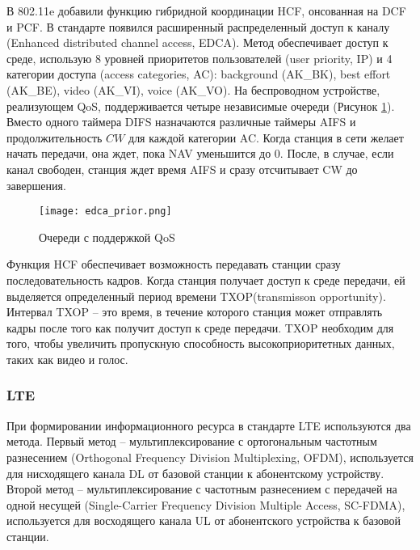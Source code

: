 В 802.11e добавили функцию гибридной координации HCF, онсованная на DCF и PCF. В стандарте появился расширенный распределенный доступ к каналу (Enhanced distributed channel access, EDCA).  Метод обеспечивает доступ к среде, использую 8 уровней приоритетов пользователей (user priority, IP) и 4 категории доступа (access categories, AC): background (AK\_BK), best effort (AK\_BE), video (AK\_VI), voice (AK\_VO). На беспроводном устройстве, реализующем QoS, поддерживается четыре независимые очереди (Рисунок \cref{fig:part1_edca_prior}). Вместо одного таймера DIFS назначаются различные таймеры AIFS и продолжительность $CW$ для каждой категории AC. Когда станция в сети желает начать передачи, она ждет, пока NAV уменьшится до 0. После, в случае, если канал свободен, станция ждет время AIFS и сразу отсчитывает CW до завершения.

\begin{figure}[h!]
  \centering
   \texttt{[image: edca\_prior.png]}
\caption{Очереди с поддержкой QoS}
\label{fig:part1_edca_prior}
\end{figure}



Функция HCF обеспечивает возможность передавать станции сразу последовательность кадров. Когда станция получает доступ к среде передачи, ей выделяется определенный период времени TXOP(transmisson opportunity). Интервал TXOP  -- это время, в течение которого станция может отправлять кадры после того как получит доступ к среде передачи. TXOP необходим для того, чтобы увеличить пропускную способность высокоприоритетных данных, таких как видео и голос.

\subsubsection{LTE}


При формировании информационного ресурса в стандарте LTE используются два метода. Первый метод -- мультиплексирование с
ортогональным частотным разнесением (Orthogonal Frequency Division Multiplexing, OFDM), используется для нисходящего канала DL от базовой станции к абонентскому устройству. Второй метод -- мультиплексирование с частотным разнесением с передачей на одной несущей (Single-Carrier Frequency Division Multiple Access, SC-FDMA), используется для восходящего канала UL от абонентского устройства к базовой станции. 
 

